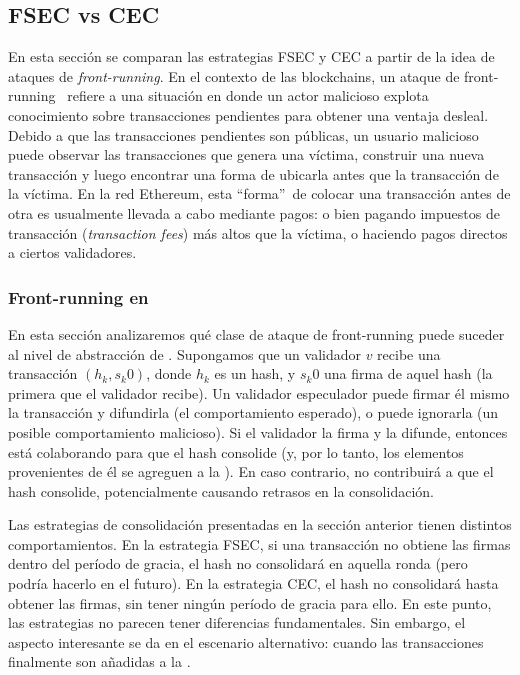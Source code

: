









\subsection{FSEC vs CEC}
En esta sección se comparan las estrategias FSEC y CEC a partir de la idea de ataques de \textit{front-running}.
En el contexto de las blockchains, un ataque de front-running~\cite{frontrunning} refiere a una situación en donde
un actor malicioso explota conocimiento sobre transacciones pendientes para obtener una ventaja
desleal. Debido a que las transacciones pendientes son públicas, un usuario malicioso puede
observar las transacciones que genera una víctima, construir una nueva transacción y luego
encontrar una forma de ubicarla antes que la transacción de la víctima. En la red Ethereum, esta
\textquotedblleft forma\textquotedblright\ de colocar una transacción antes de otra es usualmente
llevada a cabo mediante pagos: o bien pagando impuestos de transacción (\textit{transaction fees}) más altos
que la víctima, o haciendo pagos directos a ciertos validadores.
%

\subsubsection{Front-running en \hashchain}
En esta sección analizaremos qué clase de ataque de front-running puede suceder al nivel de abstracción de \hashchain.
Supongamos que un validador $v$ recibe una transacción $(h_k, s_{k}0)$, donde $h_k$ es un hash,
y $s_{k}0$ una firma de aquel hash (la primera que el validador recibe).
Un validador especulador puede firmar él mismo la
transacción y difundirla (el comportamiento esperado), o puede ignorarla (un posible comportamiento
malicioso). Si el validador la firma y la difunde, entonces está colaborando para que el hash
consolide (y, por lo tanto, los elementos provenientes de él se agreguen a la  \setchain).
En caso contrario, no contribuirá a que el hash consolide, potencialmente causando retrasos
en la consolidación.
%

%
Las estrategias de consolidación presentadas en la sección anterior tienen distintos comportamientos.
En la estrategia FSEC, si una transacción no obtiene las \SPH firmas
dentro del período de gracia, el hash no consolidará en aquella ronda (pero podría hacerlo
en el futuro).
%
En la estrategia CEC, el hash no consolidará hasta obtener las \SPH firmas,
sin tener ningún período de gracia para ello.
%
En este punto, las estrategias no parecen tener diferencias fundamentales. Sin embargo, el aspecto
interesante se da en el escenario alternativo: cuando las transacciones finalmente son añadidas a la
\setchain.
%

